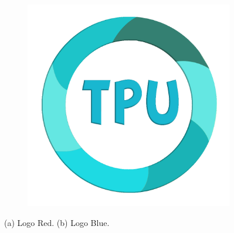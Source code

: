 \documentclass[twocolumn]{article}
\begin{document}
\begin{figure}
\begin{subfigure}[b]{0.45\columnwidth}
			\includegraphics[width=\textwidth]{Blue.png}
			\caption{}
			\label{fig:blue_logo}
		\end{subfigure}		
		\caption{(a) Logo Red. (b) Logo Blue.}
		\label{fig:app_logo}
	\end{figure}
	
\end{document}
